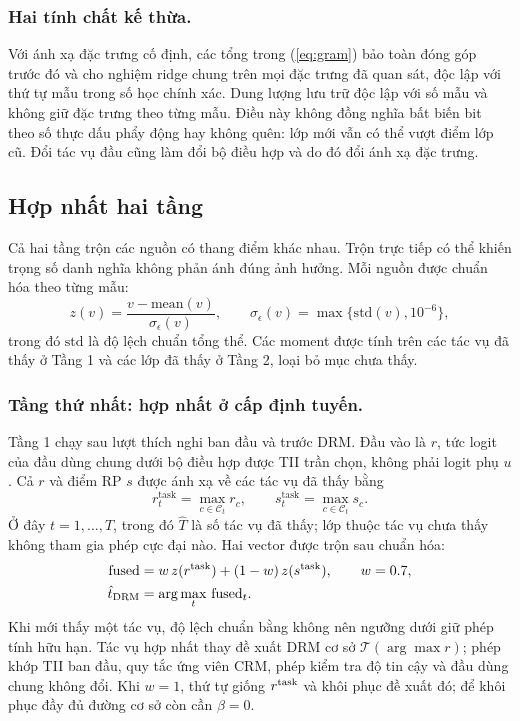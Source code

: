 \documentclass[runningheads]{llncs}
\begin{document}
\subsubsection{Hai tính chất kế thừa.}
Với ánh xạ đặc trưng cố định, các tổng trong (\ref{eq:gram}) bảo toàn đóng góp
trước đó và cho nghiệm ridge chung trên mọi đặc trưng đã quan sát, độc lập với
thứ tự mẫu trong số học chính xác. Dung lượng lưu trữ độc lập với số mẫu và
không giữ đặc trưng theo từng mẫu. Điều này không đồng nghĩa bất biến bit theo
số thực dấu phẩy động hay không quên: lớp mới vẫn có thể vượt điểm lớp cũ.
Đổi tác vụ đầu cũng làm đổi bộ điều hợp và do đó đổi ánh xạ đặc trưng.

\subsection{Hợp nhất hai tầng}

Cả hai tầng trộn các nguồn có thang điểm khác nhau. Trộn trực tiếp có thể khiến
trọng số danh nghĩa không phản ánh đúng ảnh hưởng. Mỗi nguồn được chuẩn hóa
theo từng mẫu:
\begin{equation}
z(v) = \frac{v - \mathrm{mean}(v)}{\sigma_\epsilon(v)},
\qquad \sigma_\epsilon(v)=\max\{\mathrm{std}(v),10^{-6}\},
\label{eq:znorm}
\end{equation}
trong đó $\mathrm{std}$ là độ lệch chuẩn tổng thể. Các moment được tính trên
các tác vụ đã thấy ở Tầng 1 và các lớp đã thấy ở Tầng 2, loại bỏ mục chưa thấy.

\subsubsection{Tầng thứ nhất: hợp nhất ở cấp định tuyến.}
Tầng 1 chạy sau lượt thích nghi ban đầu và trước DRM. Đầu vào là $r$, tức logit
của đầu dùng chung dưới bộ điều hợp được TII trần chọn, không phải logit phụ
$u$. Cả $r$ và điểm RP $s$ được ánh xạ về các tác vụ đã thấy bằng
\[
r^{\mathrm{task}}_t = \max_{c \in \mathcal{C}_t} r_c,
\qquad
s^{\mathrm{task}}_t = \max_{c \in \mathcal{C}_t} s_c .
\]
Ở đây $t=1,\dots,\hat{T}$, trong đó $\hat{T}$ là số tác vụ đã thấy; lớp thuộc tác
vụ chưa thấy không tham gia phép cực đại nào. Hai vector được trộn sau chuẩn hóa:
\begin{equation}
\begin{aligned}
\mathrm{fused} &= w\, z(r^{\mathrm{task}})
                 + (1-w)\, z(s^{\mathrm{task}}), \qquad w=0.7,\\
\hat{t}_{\rm DRM} &= \arg\max_t\, \mathrm{fused}_t .
\end{aligned}
\label{eq:route}
\end{equation}
Khi mới thấy một tác vụ, độ lệch chuẩn bằng không nên ngưỡng dưới giữ phép tính
hữu hạn. Tác vụ hợp nhất thay đề xuất DRM cơ sở $\mathcal T(\arg\max r)$; phép
khớp TII ban đầu, quy tắc ứng viên CRM, phép kiểm tra độ tin cậy và đầu dùng
chung không đổi. Khi $w=1$, thứ tự giống $r^{\rm task}$ và khôi phục đề xuất
đó; để khôi phục đầy đủ đường cơ sở còn cần $\beta=0$.
\end{document}
